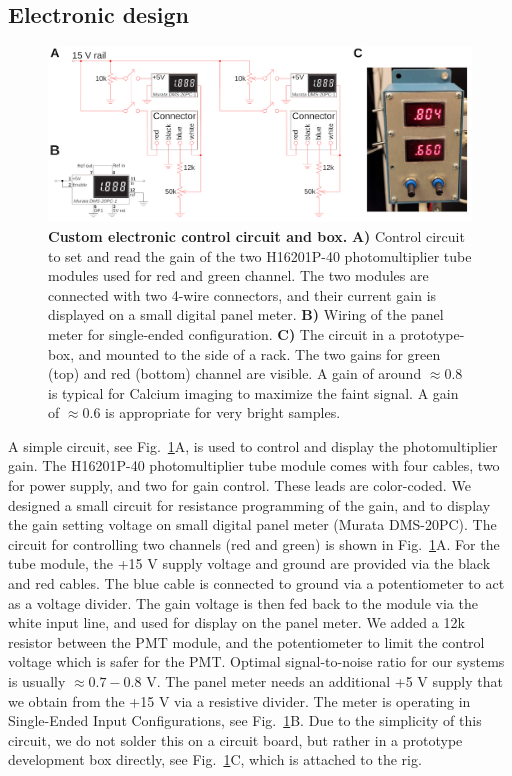 \documentclass[10pt,letterpaper]{article}
\begin{document}
\subsection*{Electronic design}
%
\begin{figure}[!t]
    \includegraphics[width=\textwidth]{fig4.jpg}
    \caption{{\bf Custom electronic control circuit and box.} \textbf{A)} Control circuit to set and read the gain of the two H16201P-40 photomultiplier tube modules used for red and green channel. The two modules are connected with two 4-wire connectors, and their current gain is displayed on a small digital panel meter. \textbf{B)} Wiring of the panel meter for single-ended configuration. \textbf{C)} The circuit in a prototype-box, and mounted to the side of a rack. The two gains for green (top) and red (bottom) channel are visible. A gain of around $\approx0.8$ is typical for Calcium imaging to maximize the faint signal. A gain of $\approx0.6$ is appropriate for very bright samples.}
    \label{fig4}
\end{figure}
%
A simple circuit, see Fig.~\ref{fig4}A, is used to control and display the photomultiplier gain. The H16201P-40 photomultiplier tube module comes with four cables, two for power supply, and two for gain control. These leads are color-coded. We designed a small circuit for resistance programming of the gain, and to display the gain setting voltage on small digital panel meter (Murata DMS-20PC). The circuit for controlling two channels (red and green) is shown in Fig.~\ref{fig4}A. For the tube module, the +15 V supply voltage and ground are provided via the black and red cables. The blue cable is connected to ground via a potentiometer to act as a voltage divider. The gain voltage is then fed back to the module via the white input line, and used for display on the panel meter. We added a 12k resistor between the PMT module, and the potentiometer to limit the control voltage which is safer for the PMT. Optimal signal-to-noise ratio for our systems is usually $\approx 0.7-0.8\text{ V}$. The panel meter needs an additional +5 V supply that we obtain from the +15 V via a resistive divider. The meter is operating in Single-Ended Input Conﬁgurations, see Fig.~\ref{fig4}B. Due to the simplicity of this circuit, we do not solder this on a circuit board, but rather in a prototype development box directly, see Fig.~\ref{fig4}C, which is attached to the rig.\newline
\end{document}
